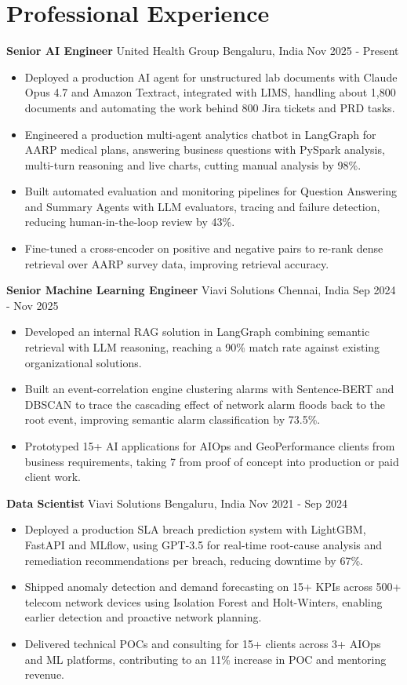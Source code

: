 \documentclass[10pt,a4paper]{article}
\newcommand{\role}[4]{\textbf{#1} \textbar{} #2 \hfill #3 \textbar{} #4\par}
\begin{document}
\section{Professional Experience}
\role{Senior AI Engineer}{United Health Group}{Bengaluru, India}{Nov 2025 - Present}
\begin{itemize}
  \item Deployed a production AI agent for unstructured lab documents with Claude Opus 4.7 and Amazon Textract, integrated with LIMS, handling about 1,800 documents and automating the work behind 800 Jira tickets and PRD tasks.
  \item Engineered a production multi-agent analytics chatbot in LangGraph for AARP medical plans, answering business questions with PySpark analysis, multi-turn reasoning and live charts, cutting manual analysis by 98\%.
  \item Built automated evaluation and monitoring pipelines for Question Answering and Summary Agents with LLM evaluators, tracing and failure detection, reducing human-in-the-loop review by 43\%.
  \item Fine-tuned a cross-encoder on positive and negative pairs to re-rank dense retrieval over AARP survey data, improving retrieval accuracy.
\end{itemize}
\vspace{3pt}
\role{Senior Machine Learning Engineer}{Viavi Solutions}{Chennai, India}{Sep 2024 - Nov 2025}
\begin{itemize}
  \item Developed an internal RAG solution in LangGraph combining semantic retrieval with LLM reasoning, reaching a 90\% match rate against existing organizational solutions.
  \item Built an event-correlation engine clustering alarms with Sentence-BERT and DBSCAN to trace the cascading effect of network alarm floods back to the root event, improving semantic alarm classification by 73.5\%.
  \item Prototyped 15+ AI applications for AIOps and GeoPerformance clients from business requirements, taking 7 from proof of concept into production or paid client work.
\end{itemize}
\vspace{3pt}
\role{Data Scientist}{Viavi Solutions}{Bengaluru, India}{Nov 2021 - Sep 2024}
\begin{itemize}
  \item Deployed a production SLA breach prediction system with LightGBM, FastAPI and MLflow, using GPT-3.5 for real-time root-cause analysis and remediation recommendations per breach, reducing downtime by 67\%.
  \item Shipped anomaly detection and demand forecasting on 15+ KPIs across 500+ telecom network devices using Isolation Forest and Holt-Winters, enabling earlier detection and proactive network planning.
  \item Delivered technical POCs and consulting for 15+ clients across 3+ AIOps and ML platforms, contributing to an 11\% increase in POC and mentoring revenue.
\end{itemize}
\end{document}
